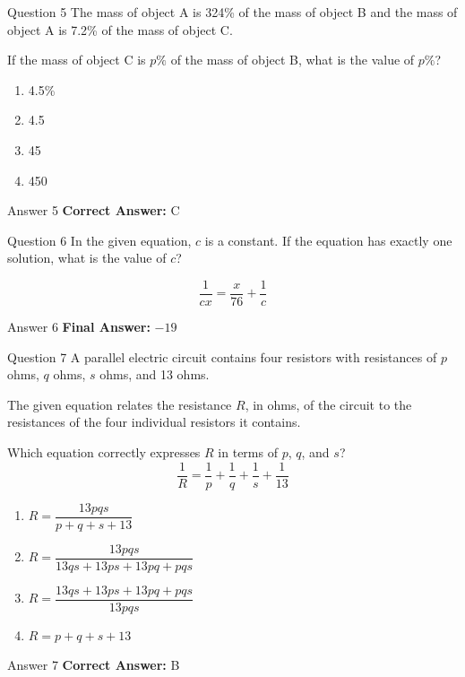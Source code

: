 \documentclass{beamer}
\begin{document}
\begin{frame}{Question 5}
\small
The mass of object A is 324\% of the mass of object B and the mass of object A is 7.2\% of the mass of object C.

If the mass of object C is \(p\%\) of the mass of object B, what is the value of \(p\%\)?
\vspace{0.35cm}
\begin{enumerate}
    \item[A.] 4.5\%
    \item[B.] 4.5
    \item[C.] 45
    \item[D.] 450
\end{enumerate}
\end{frame}
\begin{frame}{Answer 5}
\small
\textbf{Correct Answer:} C
\end{frame}

\begin{frame}{Question 6}
\small
In the given equation, \(c\) is a constant. If the equation has exactly one solution, what is the value of \(c\)?

\[
\frac{1}{cx} = \frac{x}{76} + \frac{1}{c}
\]
\end{frame}
\begin{frame}{Answer 6}
\small
\textbf{Final Answer:} $\boxed{-19}$
\end{frame}

\begin{frame}{Question 7}
\small
A parallel electric circuit contains four resistors with resistances of \(p\) ohms, \(q\) ohms, \(s\) ohms, and 13 ohms.

The given equation relates the resistance \(R\), in ohms, of the circuit to the resistances of the four individual resistors it contains.

Which equation correctly expresses \(R\) in terms of \(p\), \(q\), and \(s\)?
\[
\frac{1}{R} = \frac{1}{p} + \frac{1}{q} + \frac{1}{s} + \frac{1}{13}
\]
\vspace{0.35cm}
\begin{enumerate}
    \item[A.] \(R = \dfrac{13pqs}{p + q + s + 13}\)
    \item[B.] \(R = \dfrac{13pqs}{13qs + 13ps + 13pq + pqs}\)
    \item[C.] \(R = \dfrac{13qs + 13ps + 13pq + pqs}{13pqs}\)
    \item[D.] \(R = p + q + s + 13\)
\end{enumerate}
\end{frame}
\begin{frame}{Answer 7}
\small
\textbf{Correct Answer:} B
\end{frame}
\end{document}
